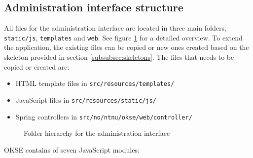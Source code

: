 \subsection{Administration interface structure}

All files for the administration interface are located in three main folders, \verb!static/js!, \verb!templates! and \verb!web!. See figure \ref{fig:oac-folder-hierarchy} for a detailed overview. To extend the application, the existing files can be copied or new ones created based on the skeleton provided in section \ref{subsubsec:skeletons}. The files that needs to be copied or created are:

\begin{itemize}
\item HTML template files in \verb!src/resources/templates/!
\item JavaScript files in \verb!src/resources/static/js/!
\item Spring controllers in \verb!src/no/ntnu/okse/web/controller/! 
\end{itemize}

\begin{center}
  \begin{figure}[ht!]
    \caption{Folder hierarchy for the administration interface}
    \label{fig:oac-folder-hierarchy}
  \end{figure}
\end{center}

\noindent OKSE contains of seven JavaScript modules: 

